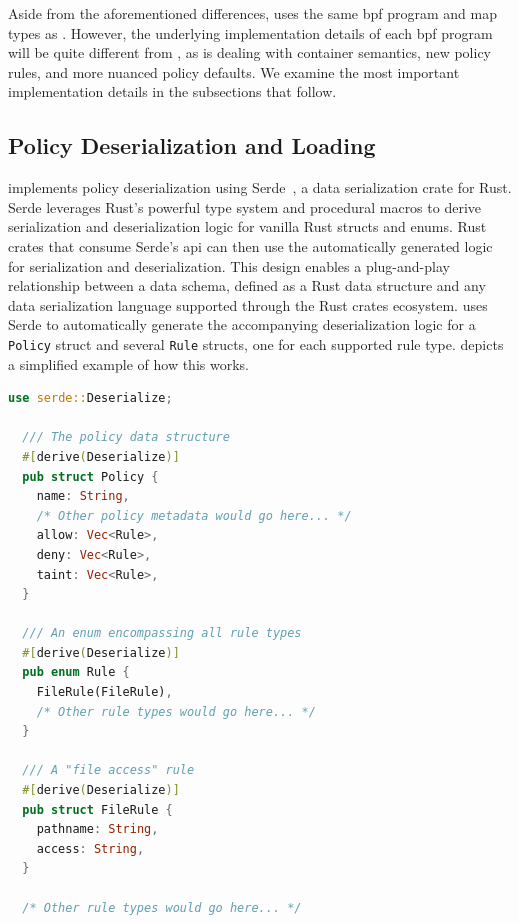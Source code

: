 Aside from the aforementioned differences, \bpfcontain{} uses the same \gls{bpf} program
and map types as \bpfbox{}. However, the underlying implementation details of each
\gls{bpf} program will be quite different from \bpfbox{}, as \bpfcontain{} is dealing with
container semantics, new policy rules, and more nuanced policy defaults. We examine the
most important implementation details in the subsections that follow.



\subsection{Policy Deserialization and Loading}%
\label{ss:bpfcontain-serde}

\bpfcontain{} implements policy deserialization using Serde~\cite{serde}, a data
serialization crate for Rust. Serde leverages Rust's powerful type system and procedural
macros to derive serialization and deserialization logic for vanilla Rust structs and
enums. Rust crates that consume Serde's \gls{api} can then use the automatically generated
logic for serialization and deserialization. This design enables a plug-and-play
relationship between a data schema, defined as a Rust data structure and any data
serialization language supported through the Rust crates ecosystem. \bpfcontain{} uses
Serde to automatically generate the accompanying deserialization logic for
a \texttt{Policy} struct and several \texttt{Rule} structs, one for each supported rule
type.  depicts a simplified example of how this works.

\begin{lstlisting}[language=Rust, gobble=2, caption={[A simplified example of \bpfcontain{}'s policy deserialization logic]
  A simplified example of \bpfcontain{}'s policy deserialization logic. Policy rules are
  specified declaratively using Rust structs and the corresponding deserialization logic
  is automatically generated by the Serde crate, using a simple decorator macro.
},
label={lst:bpfcontain-serde}]
  use serde::Deserialize;

  /// The policy data structure
  #[derive(Deserialize)]
  pub struct Policy {
    name: String,
    /* Other policy metadata would go here... */
    allow: Vec<Rule>,
    deny: Vec<Rule>,
    taint: Vec<Rule>,
  }

  /// An enum encompassing all rule types
  #[derive(Deserialize)]
  pub enum Rule {
    FileRule(FileRule),
    /* Other rule types would go here... */
  }

  /// A "file access" rule
  #[derive(Deserialize)]
  pub struct FileRule {
    pathname: String,
    access: String,
  }

  /* Other rule types would go here... */
\end{lstlisting}

